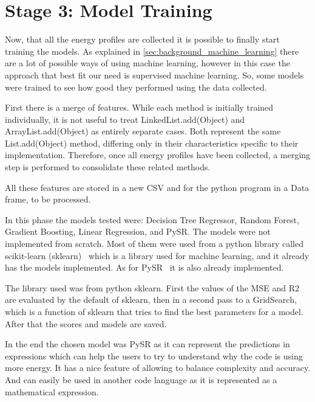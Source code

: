 \section{Stage 3: Model Training} \label{sec:work_stage3_model_training}

Now, that all the energy profiles are collected it is possible to finally start training the models. As explained in \ref{sec:background_machine_learning} there are a lot of possible ways of using machine learning, however in this case the approach that best fit our need is supervised machine learning. So, some models were trained to see how good they performed using the data collected.

First there is a merge of features. While each method is initially trained individually, it is not useful to treat LinkedList.add(Object) and ArrayList.add(Object) as entirely separate cases. Both represent the same List.add(Object) method, differing only in their characteristics specific to their implementation. Therefore, once all energy profiles have been collected, a merging step is performed to consolidate these related methods.

All these features are stored in a new CSV and for the python program in a Data frame, to be processed.

In this phase the models tested were: Decision Tree Regressor, Random Forest, Gradient Boosting, Linear Regression, and PySR. The models were not implemented from scratch. Most of them were used from a python library called scikit-learn (sklearn)~\cite{scikit-learn} which is a library used for machine learning, and it already has the models implemented. As for PySR~\cite{cranmer2023interpretablemachinelearningscience} it is also already implemented.

The library used was from python sklearn. First the values of the MSE and R2 are evaluated by the default of sklearn, then in a second pass to a GridSearch, which is a function of sklearn that tries to find the best parameters for a model. After that the scores and models are saved.

In the end the chosen model was PySR as it can represent the predictions in expressions which can help the users to try to understand why the code is using more energy. It has a nice feature of allowing to balance complexity and accuracy. And can easily be used in another code language as it is represented as a mathematical expression.

